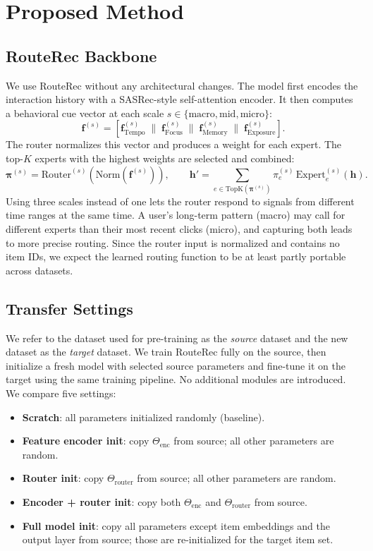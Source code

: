 \documentclass{article}
\begin{document}
\section{Proposed Method}

\subsection{RouteRec Backbone}
We use RouteRec without any architectural changes. The model first encodes the interaction history with a SASRec-style self-attention encoder. It then computes a behavioral cue vector at each scale $s \in \{\text{macro}, \text{mid}, \text{micro}\}$:
\[
\mathbf{f}^{(s)} = [\mathbf{f}^{(s)}_{\text{Tempo}} \;\|\; \mathbf{f}^{(s)}_{\text{Focus}} \;\|\; \mathbf{f}^{(s)}_{\text{Memory}} \;\|\; \mathbf{f}^{(s)}_{\text{Exposure}}].
\]
The router normalizes this vector and produces a weight for each expert. The top-$K$ experts with the highest weights are selected and combined:
\[
\boldsymbol{\pi}^{(s)} = \mathrm{Router}^{(s)}\!\left(\mathrm{Norm}(\mathbf{f}^{(s)})\right), \qquad
\mathbf{h}' = \sum_{e \in \mathrm{TopK}(\boldsymbol{\pi}^{(s)})} \pi^{(s)}_e\, \mathrm{Expert}^{(s)}_e(\mathbf{h}).
\]
Using three scales instead of one lets the router respond to signals from different time ranges at the same time. A user's long-term pattern (macro) may call for different experts than their most recent clicks (micro), and capturing both leads to more precise routing. Since the router input is normalized and contains no item IDs, we expect the learned routing function to be at least partly portable across datasets.

\subsection{Transfer Settings}
We refer to the dataset used for pre-training as the \emph{source} dataset and the new dataset as the \emph{target} dataset. We train RouteRec fully on the source, then initialize a fresh model with selected source parameters and fine-tune it on the target using the same training pipeline. No additional modules are introduced. We compare five settings:

\begin{itemize}
  \setlength{\itemsep}{1pt}
  \item \textbf{Scratch}: all parameters initialized randomly (baseline).
  \item \textbf{Feature encoder init}: copy $\Theta_{\text{enc}}$ from source; all other parameters are random.
  \item \textbf{Router init}: copy $\Theta_{\text{router}}$ from source; all other parameters are random.
  \item \textbf{Encoder + router init}: copy both $\Theta_{\text{enc}}$ and $\Theta_{\text{router}}$ from source.
  \item \textbf{Full model init}: copy all parameters except item embeddings and the output layer from source; those are re-initialized for the target item set.
\end{itemize}
\end{document}
